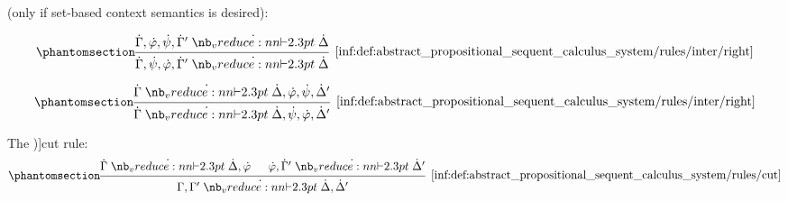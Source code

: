 \begin{definition}
\begin{thmenum}
      (only if set-based context semantics is desired):
    \begin{paracol}{2}
      \begin{leftcolumn}
        \ParacolAlignmentHack
        \begin{equation*}\taglabel[\ensuremath{ \logic{Inter}_L }]{inf:def:abstract_propositional_sequent_calculus_system/rules/inter/left}
          \begin{prooftree}
            \hypo{ \syn\Gamma, \syn\varphi, \syn\psi, \syn\Gamma' \synvdash \syn\Delta }
            \infer1[\ref{inf:def:abstract_propositional_sequent_calculus_system/rules/inter/right}]{ \syn\Gamma, \syn\psi, \syn\varphi, \syn\Gamma' \synvdash \syn\Delta }
          \end{prooftree}
        \end{equation*}
      \end{leftcolumn}

      \begin{rightcolumn}
        \ParacolAlignmentHack
        \begin{equation*}\taglabel[\ensuremath{ \logic{Inter}_R }]{inf:def:abstract_propositional_sequent_calculus_system/rules/inter/right}
          \begin{prooftree}
            \hypo{ \syn\Gamma \synvdash \syn\Delta, \syn\varphi, \syn\psi, \syn\Delta' }
            \infer1[\ref{inf:def:abstract_propositional_sequent_calculus_system/rules/inter/right}]{ \syn\Gamma \synvdash \syn\Delta, \syn\psi, \syn\varphi, \syn\Delta' }
          \end{prooftree}
        \end{equation*}
      \end{rightcolumn}
    \end{paracol}

     The \term[ru=правило сечения (\cite[219]{КолмогоровДрагалин2006Логика})]{cut rule}:
    \begin{equation*}\taglabel[\logic{Cut}]{inf:def:abstract_propositional_sequent_calculus_system/rules/cut}
      \begin{prooftree}
        \hypo{ \syn\Gamma \synvdash \syn\Delta, \syn\varphi }
        \hypo{ \syn\varphi, \syn\Gamma' \synvdash \syn\Delta' }
        \infer2[\ref{inf:def:abstract_propositional_sequent_calculus_system/rules/cut}]{ \Gamma, \Gamma' \synvdash \syn\Delta, \syn\Delta' }
      \end{prooftree}
    \end{equation*}
  \end{thmenum}
\end{definition}

